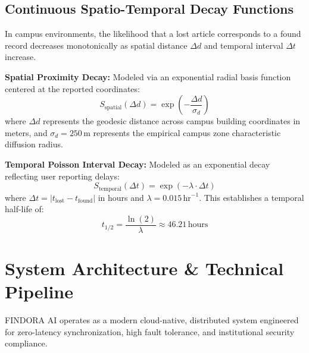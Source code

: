 \documentclass[conference]{IEEEtran}
\begin{document}
\subsection{Continuous Spatio-Temporal Decay Functions}
In campus environments, the likelihood that a lost article corresponds to a found record decreases monotonically as spatial distance $\Delta d$ and temporal interval $\Delta t$ increase. 

\textbf{Spatial Proximity Decay:} Modeled via an exponential radial basis function centered at the reported coordinates:
\begin{equation}
    S_{\text{spatial}}(\Delta d) = \exp\left(-\frac{\Delta d}{\sigma_d}\right)
\end{equation}
where $\Delta d$ represents the geodesic distance across campus building coordinates in meters, and $\sigma_d = 250\,\text{m}$ represents the empirical campus zone characteristic diffusion radius.

\textbf{Temporal Poisson Interval Decay:} Modeled as an exponential decay reflecting user reporting delays:
\begin{equation}
    S_{\text{temporal}}(\Delta t) = \exp(-\lambda \cdot \Delta t)
\end{equation}
where $\Delta t = |t_{\text{lost}} - t_{\text{found}}|$ in hours and $\lambda = 0.015\,\text{hr}^{-1}$. This establishes a temporal half-life of:
\begin{equation}
    t_{1/2} = \frac{\ln(2)}{\lambda} \approx 46.21\,\text{hours}
\end{equation}

\section{System Architecture \& Technical Pipeline}

FINDORA AI operates as a modern cloud-native, distributed system engineered for zero-latency synchronization, high fault tolerance, and institutional security compliance.
\end{document}

